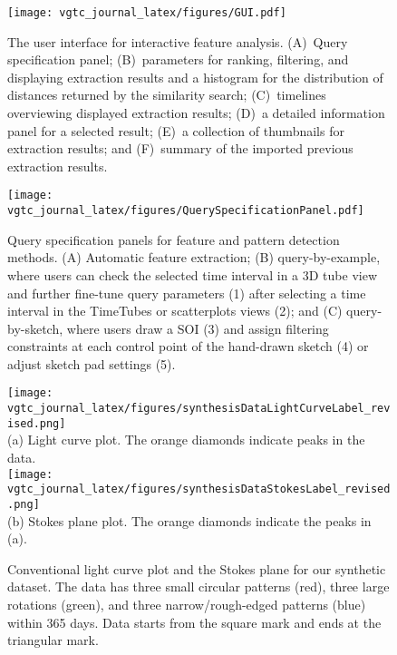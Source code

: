 \begin{figure}[t]
    \begin{minipage}{\columnwidth}
        \begin{center}
            \texttt{[image: vgtc\_journal\_latex/figures/GUI.pdf]}
        \end{center}
        \begin{minipage}{\columnwidth}
        \caption{
        The user interface for interactive feature analysis. (A)~Query specification panel; (B)~parameters for ranking, filtering, and displaying extraction results and a histogram for the distribution of distances returned by the similarity search; (C)~timelines overviewing displayed extraction results; (D)~a detailed information panel for a selected result; (E)~a collection of thumbnails for extraction results; and (F)~summary of the imported previous extraction results.}
        \label{fig:UIFeatureExtraction}
        \end{minipage}
    \end{minipage}
\end{figure}
\begin{figure}[t]
    \begin{minipage}{\columnwidth}
        \begin{center}
            \texttt{[image: vgtc\_journal\_latex/figures/QuerySpecificationPanel.pdf]}
        \end{center}
        \begin{minipage}{\columnwidth}
        \caption{Query specification panels for feature and pattern detection methods. (A) Automatic feature extraction; (B) query-by-example, where users can check the selected time interval in a 3D tube view and further fine-tune query parameters (1) after selecting a time interval in the TimeTubes or scatterplots views (2);
         and (C) query-by-sketch, where users draw a SOI (3) and assign filtering constraints at each control point of the hand-drawn sketch (4) or adjust sketch pad settings (5).}
        \label{fig:querySpecificationPanel}
        \end{minipage}
    \end{minipage}
\end{figure}
\begin{figure}[t]
    \centering
    \vspace{3mm}
    \texttt{[image: vgtc\_journal\_latex/figures/synthesisDataLightCurveLabel\_revised.png]}\\
    \footnotesize{\sf (a) Light curve plot. The orange diamonds indicate peaks in the data.}\\
    \texttt{[image: vgtc\_journal\_latex/figures/synthesisDataStokesLabel\_revised.png]}\\
    \footnotesize{\sf (b) Stokes plane plot. The orange diamonds indicate the peaks in (a).}
    \caption{Conventional light curve plot and the Stokes plane for our synthetic dataset. The data has three small circular patterns (red), three large rotations (green), and three narrow/rough-edged patterns (blue) within 365 days. Data starts from the square mark and ends at the triangular mark.}
    \label{fig:synthesisData}
\end{figure}





